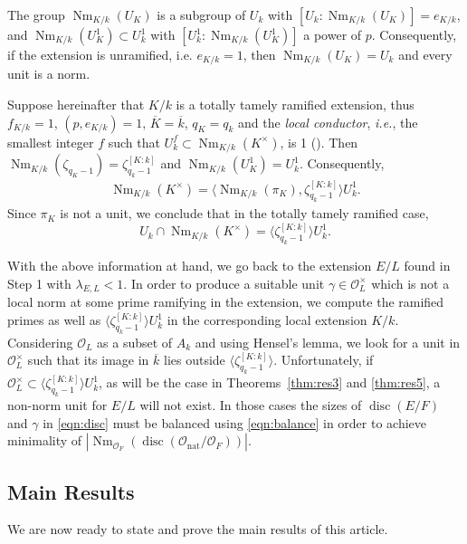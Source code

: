 \documentclass[smallextended]{svjour3}
\newcommand{\mcf}{\Or_{F}}
\newcommand{\Or}{\mathcal{O}}
\DeclareMathOperator{\Nm}{Nm}
\DeclareMathOperator{\nat}{nat}
\DeclareMathOperator{\disc}{disc}
\begin{document}
The group $\Nm_{K/k} (U_K)$ is a subgroup of $U_k$ with $[U_k: \Nm_{K/k}(U_K)]=e_{K/k} $, and $\Nm_{K/k}(U_K^1) \subset U_k^1$ with $[U_k^1: \Nm_{K/k}(U_K^1)]$ a power of $p$.
Consequently, if the extension is unramified, i.e. $e_{K/k}=1$, then  $\Nm_{K/k}(U_K)=U_k$ and every unit is a norm. 

Suppose hereinafter that $K/k$ is a totally tamely ramified extension, thus $f_{K/k} = 1$,  $(p, e_{K/k}) = 1$, $\overline K = \overline k$, $q_K = q_k$ and the \emph{local conductor}, \emph{i.e.}, the smallest integer $f$ such that $U_ k^f \subset \Nm_{K/k}(K^{\times})$, is 1 (\cite[Aside 1.9]{JM2}). Then $\Nm_{K/k}(\zeta_{q_K-1})=\zeta_{q_k-1}^{[K:k]}$ and $\Nm_{K/k}(U_K^1)=U_k^1$. 
Consequently, 
\begin{align*}
	\Nm_{K/k}(K^{\times}) = \langle \Nm_{K/k}(\pi_K), \zeta_{q_k-1}^{[K:k]}\rangle U_k^1.
\end{align*}
Since $\pi_K$ is not a unit, we conclude that in the totally tamely ramified case,
\begin{equation}
\label{eqn:nonnorm}
	U_k \cap \Nm_{K/k}(K^{\times})= \langle \zeta_{q_k-1}^{[K:k]}\rangle U_k^1.
\end{equation}
	
With the above information at hand, we go back to the extension $E/L$ found in Step 1 with $\lambda_{E,L} < 1$. In order to produce a suitable unit $\gamma \in \Or_L^{\times}$ which is not a local norm at some prime ramifying in the extension, we compute the ramified primes as well as $\langle \zeta_{q_k-1}^{[K:k]}\rangle U_k^1$ in the corresponding local extension $K/k$. Considering $\Or_L$ as a subset of $A_k$ and using Hensel's lemma, we look for a unit in $\Or_L^{\times}$ such that its image in $\overline{k}$ lies  outside $\langle \zeta_{q_k-1}^{[K:k]}\rangle$.
Unfortunately, if $\Or_L^{\times} \subset \langle \zeta_{q_k-1}^{[K:k]}\rangle U_k^1$, as will be the case in Theorems~\ref{thm:res3} and \ref{thm:res5}, a non-norm unit for $E/L$ will not exist. In those cases the sizes of $\disc(E/F)$ and $\gamma$ in \eqref{eqn:disc} must be balanced using \eqref{eqn:balance} in order to achieve minimality of $|\Nm_{\Or_F}(\disc(\Or_{\nat}/\mcf))|$.  

\subsection{Main Results}    

We are now ready to state and prove the main results of this article. 
    
\end{document}
